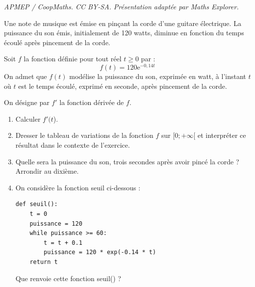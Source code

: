 \documentclass[10pt]{article}
\providecommand{\e}{{\mathrm{e}}}
\begin{document}
\noindent\textit{APMEP / CoopMaths. CC BY-SA. Présentation adaptée par Maths Explorer.}\par\medskip
\medskip

Une note de musique est émise en pinçant la corde d'une guitare électrique. La puissance du son émis, initialement de 120 watts, diminue en fonction du temps écoulé après pincement de la corde.

Soit $f$ la fonction définie pour tout réel $t\geqslant 0$ par :\[f(t)= 120\e^{-0,14t}\]
On admet que $f(t)$ modélise la puissance du son, exprimée en watt, à l'instant $t$ où $t$ est le temps écoulé, exprimé en seconde, après pincement de la corde.

On désigne par $f'$ la fonction dérivée de $f$.

\medskip

\begin{enumerate}
\item Calculer $f'(t$).
\item Dresser le tableau de variations de la fonction $f$ sur $[0 ; +\infty[$ et interpréter ce résultat dans le contexte de l'exercice.
\item Quelle sera la puissance du son, trois secondes après avoir pincé la corde ? Arrondir au dixième.
\item On considère la fonction seuil ci-dessous :
\begin{lstlisting}[style=python]
def seuil():
    t = 0
    puissance = 120
    while puissance >= 60:
        t = t + 0.1
        puissance = 120 * exp(-0.14 * t)
    return t
\end{lstlisting}

Que renvoie cette fonction seuil() ?
\end{enumerate}

\vspace{0,5cm}
\end{document}
